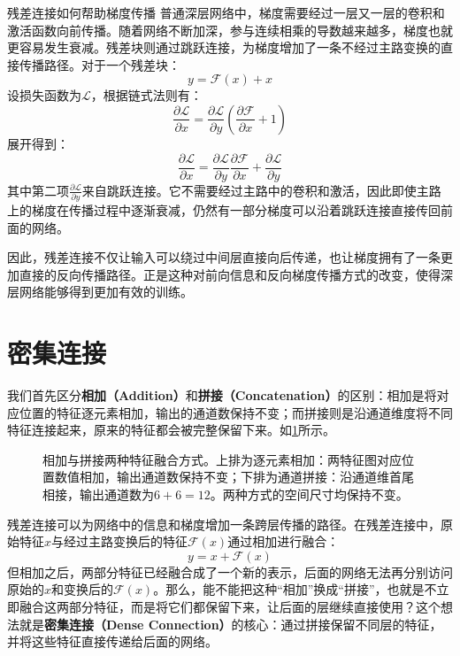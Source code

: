 \begin{orangeBox}{残差连接如何帮助梯度传播}
普通深层网络中，梯度需要经过一层又一层的卷积和激活函数向前传播。随着网络不断加深，参与连续相乘的导数越来越多，梯度也就更容易发生衰减。残差块则通过跳跃连接，为梯度增加了一条不经过主路变换的直接传播路径。对于一个残差块：
$$
y=\mathcal{F}(x)+x
$$
设损失函数为$\mathcal{L}$，根据链式法则有：
$$
\frac{\partial \mathcal{L}}{\partial x} = \frac{\partial \mathcal{L}}{\partial y} \left(\frac{\partial \mathcal{F}}{\partial x}+1\right)
$$
展开得到：
$$
\frac{\partial \mathcal{L}}{\partial x}=\frac{\partial \mathcal{L}}{\partial y}\frac{\partial \mathcal{F}}{\partial x}+\frac{\partial \mathcal{L}}{\partial y}
$$
其中第二项$\frac{\partial \mathcal{L}}{\partial y}$来自跳跃连接。它不需要经过主路中的卷积和激活，因此即使主路上的梯度在传播过程中逐渐衰减，仍然有一部分梯度可以沿着跳跃连接直接传回前面的网络。

因此，残差连接不仅让输入可以绕过中间层直接向后传递，也让梯度拥有了一条更加直接的反向传播路径。正是这种对前向信息和反向梯度传播方式的改变，使得深层网络能够得到更加有效的训练。
\end{orangeBox}

\section{密集连接}

我们首先区分\textbf{相加（Addition）}和\textbf{拼接（Concatenation）}的区别：相加是将对应位置的特征逐元素相加，输出的通道数保持不变；而拼接则是沿通道维度将不同特征连接起来，原来的特征都会被完整保留下来。如\cref{fig:add_concat}所示。

\begin{figure}[H]
    \caption{相加与拼接两种特征融合方式。上排为逐元素相加：两特征图对应位置数值相加，输出通道数保持不变；下排为通道拼接：沿通道维首尾相接，输出通道数为$6+6=12$。两种方式的空间尺寸均保持不变。}
    \label{fig:add_concat}
\end{figure}

残差连接可以为网络中的信息和梯度增加一条跨层传播的路径。在残差连接中，原始特征$x$与经过主路变换后的特征$\mathcal{F}(x)$通过相加进行融合：
$$
y=x+\mathcal{F}(x)
$$
但相加之后，两部分特征已经融合成了一个新的表示，后面的网络无法再分别访问原始的$x$和变换后的$\mathcal{F}(x)$。那么，能不能把这种“相加”换成“拼接”，也就是不立即融合这两部分特征，而是将它们都保留下来，让后面的层继续直接使用？这个想法就是\textbf{密集连接（Dense Connection）}的核心：通过拼接保留不同层的特征，并将这些特征直接传递给后面的网络。


